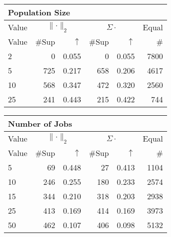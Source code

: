 \begin{center}
\renewcommand{\tabcolsep}{4pt}
\renewcommand{\arraystretch}{1.1}
\begin{customnormal}
\begin{tabular}{lrrrrr}
\multicolumn{6}{l}{Population Size}\\
\toprule
\multicolumn{1}{c}{Value} & \multicolumn{2}{c}{$\lVert \cdot \rVert_2$} & \multicolumn{2}{c}{$\Sigma \cdot$} & \multicolumn{1}{c}{Equal} \\ 
\cmidrule(lr){1-1} \cmidrule(lr){2-3} \cmidrule(lr){4-5}  \cmidrule(lr){6-6}
Value & \#Sup & $\uparrow$ & \#Sup & $\uparrow$ & \# \\ 
\midrule
2 & 0 & 0.055 & 0 & 0.055 & 7800 \\ 
5 & 725 & 0.217 & 658 & 0.206 & 4617 \\ 
10 & 568 & 0.347 & 472 & 0.320 & 2560 \\ 
25 & 241 & 0.443 & 215 & 0.422 & 744 \\ 
\bottomrule
\end{tabular}


\end{customnormal}
\end{center}
\begin{center}
\renewcommand{\tabcolsep}{4pt}
\renewcommand{\arraystretch}{1.1}
\begin{customnormal}
\begin{tabular}{lrrrrr}
\multicolumn{6}{l}{Number of Jobs}\\
\toprule
\multicolumn{1}{c}{Value} & \multicolumn{2}{c}{$\lVert \cdot \rVert_2$} & \multicolumn{2}{c}{$\Sigma \cdot$} & \multicolumn{1}{c}{Equal} \\ 
\cmidrule(lr){1-1} \cmidrule(lr){2-3} \cmidrule(lr){4-5}  \cmidrule(lr){6-6}
Value & \#Sup & $\uparrow$ & \#Sup & $\uparrow$ & \# \\ 
\midrule
5 & 69 & 0.448 & 27 & 0.413 & 1104 \\ 
10 & 246 & 0.255 & 180 & 0.233 & 2574 \\ 
15 & 344 & 0.210 & 318 & 0.203 & 2938 \\ 
25 & 413 & 0.169 & 414 & 0.169 & 3973 \\ 
50 & 462 & 0.107 & 406 & 0.098 & 5132 \\ 
\bottomrule
\end{tabular}


\end{customnormal}
\end{center}
